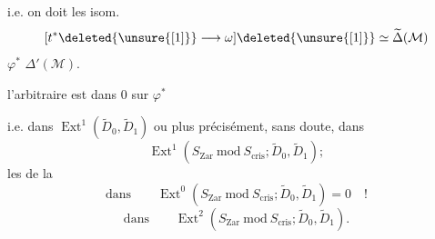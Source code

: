i.e. on doit   les isom.
\[
[t^*\deleted{\unsure{[1]}}\longrightarrow\omega]\deleted{\unsure{[1]}}\simeq\widetilde\Delta(\mathcal M)
\]
   $\varphi^*$  $\Delta'(\mathcal M)$.

l'arbitraire est dans  $0$ sur  $\varphi^*$

i.e. dans $\operatorname{Ext}^1(\widetilde D_0,\widetilde D_1)$ ou plus précisément, sans doute, dans
\[
\operatorname{Ext}^1(S_{\mathrm{Zar}}\ \mathrm{mod}\ S_{\mathrm{cris}};\widetilde D_0,\widetilde D_1);
\]
les  de la 
\[
\text{dans}\qquad\operatorname{Ext}^0(S_{\mathrm{Zar}}\ \mathrm{mod}\ S_{\mathrm{cris}};\widetilde D_0,\widetilde D_1)=0\quad!
\]
\[
\text{dans}\qquad\operatorname{Ext}^2(S_{\mathrm{Zar}}\ \mathrm{mod}\ S_{\mathrm{cris}};\widetilde D_0,\widetilde D_1).
\]
